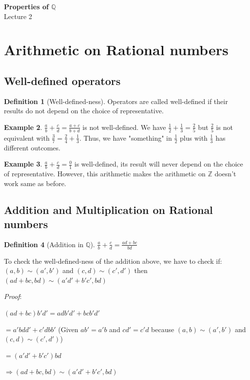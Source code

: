 \documentclass[12pt]{article}
\newcommand{\ZZ}{\mathbb{Z}}   %
\newcommand{\QQ}{\mathbb{Q}}   %
\theoremstyle{definition}
\newtheorem{definition}{Definition}[section]
\newtheorem{example}[definition]{Example}
\theoremstyle{plain}
\begin{document}

\begin{center}
    {\Large \textbf{Properties of $\mathbb{Q}$}}\\[0.5em]
    {\large Lecture 2}
\end{center}

\tableofcontents

\newpage
\section{Arithmetic on Rational numbers}
\subsection{Well-defined operators}
\begin{definition}[Well-defined-ness]
Operators are called well-defined if their results do not depend on the choice of representative.
\end{definition}
\begin{example}
$\frac{a}{b} + \frac{c}{d} = \frac{a+c}{b+d}$ is not well-defined. We have $\frac{1}{2} + \frac{1}{3} = \frac{2}{5}$ but $\frac{2}{5}$ is not equivalent with $\frac{3}{7} = \frac{2}{4} + \frac{1}{3}$. Thus, we have "something" in $\frac{1}{2}$ plus with $\frac{1}{3}$ has different outcomes.
\end{example}

\begin{example}
$\frac{a}{b} + \frac{c}{d} = \frac{0}{1}$ is well-defined, its result will never depend on the choice of representative. However, this arithmetic makes the arithmetic on $\ZZ$ doesn't work same as before.
\end{example}

\subsection{Addition and Multiplication on Rational numbers}

\begin{definition}[Addition in $\QQ$]
$\frac{a}{b}+\frac{c}{d} = \frac{ad+bc}{bd}$
\end{definition}
\begin{note}
To check the well-defined-ness of the addition above, we have to check if:
$(a,b) \sim (a', b')$ and $(c,d) \sim (c', d')$ then $(ad+bc,bd) \sim (a'd'+b'c', bd)$

\textit{Proof}:

$(ad+bc)b'd' = adb'd'+bcb'd'$

$= a'bdd'+c'dbb'$ (Given $ab'=a'b$ and $cd'=c'd$ because $(a,b)\sim(a',b')$ and $(c,d)\sim(c',d')$)

$= (a'd'+b'c')bd$

$\Rightarrow (ad+bc,bd) \sim (a'd'+b'c', bd)$
\end{note}
\end{document}
